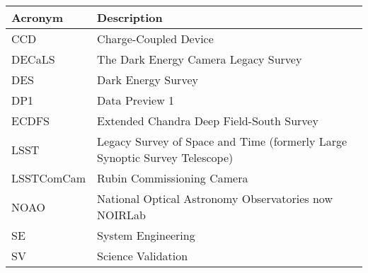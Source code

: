 \addtocounter{table}{-1}
\begin{longtable}{p{}p{}}\hline
\textbf{Acronym} & \textbf{Description}  \\\hline

CCD & Charge-Coupled Device \\\hline
DECaLS & The Dark Energy Camera Legacy Survey \\\hline
DES & Dark Energy Survey \\\hline
DP1 & Data Preview 1 \\\hline
ECDFS & Extended Chandra Deep Field-South Survey \\\hline
LSST & Legacy Survey of Space and Time (formerly Large Synoptic Survey Telescope) \\\hline
LSSTComCam & Rubin Commissioning Camera \\\hline
NOAO & National Optical Astronomy Observatories now NOIRLab \\\hline
SE & System Engineering \\\hline
SV & Science Validation \\\hline
\end{longtable}
